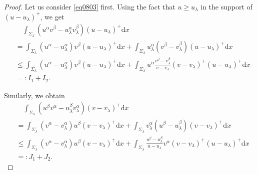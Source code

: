 \documentclass[12pt]{amsart}
\theoremstyle{definition}
\theoremstyle{remark}
\theoremstyle{conclusion}
\theoremstyle{conjecture}
\numberwithin{equation}{section}
\begin{document}
\begin{proof}
\smallskip

Let us consider \eqref{eq0803} first. Using the fact that $u\geq u_\lambda$ in the support of $(u-u_\lambda)^+$, we get
\begin{align}\label{eq0804}
&\quad \int_{\Sigma_\lambda} ( u^\alpha v^\beta -u^{\alpha}_{\lambda}v^{\beta}_{\lambda} ) (u-u_\lambda)^+ \mathrm{d}x  \\
&= \int_{\Sigma_\lambda} (u^{\alpha}-u^\alpha_{\lambda})v^\beta (u-u_\lambda)^+ \mathrm{d}x + \int_{\Sigma_\lambda}u^\alpha_{\lambda}(v^\beta -v^{\beta}_{\lambda}) (u-u_\lambda)^+ \mathrm{d}x \nonumber\\
&\leq  \int_{\Sigma_\lambda}  (u^{\alpha}-u^\alpha_{\lambda})v^\beta (u-u_\lambda)^+\mathrm{d}x + \int_{\Sigma_\lambda}  u^{\alpha}
\frac{v^\beta -v^{\beta}_{\lambda}}{v-v_\lambda} (v-v_\lambda)^+  (u-u_\lambda)^+ \mathrm{d}x\nonumber\\
&=: I_1 + I_2. \nonumber
\end{align}

Similarly, we obtain
\begin{align}\label{eq0804-}
    &\quad \int_{\Sigma_\lambda} ( u^\beta v^\alpha -u^{\beta}_{\lambda}v^{\alpha}_{\lambda} ) (v-v_\lambda)^+ \mathrm{d}x  \\
&= \int_{\Sigma_\lambda} (v^{\alpha}-v^\alpha_{\lambda})u^\beta (v-v_\lambda)^+ \mathrm{d}x + \int_{\Sigma_\lambda}v^\alpha_{\lambda}(u^\beta -u^{\beta}_{\lambda}) (v-v_\lambda)^+ \mathrm{d}x \nonumber\\
&\leq  \int_{\Sigma_\lambda}  (v^{\alpha}-v^\alpha_\lambda)u^\beta (v-v_\lambda)^+\mathrm{d}x + \int_{\Sigma_\lambda}  \frac{u^\beta -u^{\beta}_{\lambda}}{u-u_\lambda}v^{\alpha}
(v-v_\lambda)^+  (u-u_\lambda)^+ \mathrm{d}x\nonumber\\
&=: J_1 + J_2. \nonumber
\end{align}


\end{proof}
\end{document}
